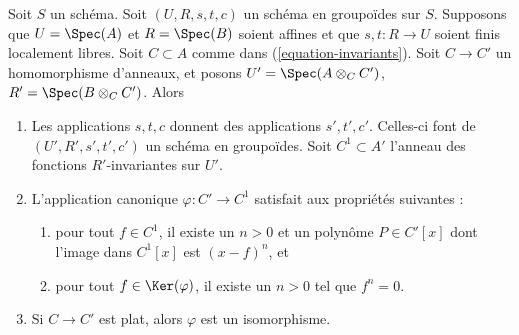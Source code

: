 \begin{lemma}
\label{lemma-invariants-base-change}
Soit $S$ un schéma. Soit $(U, R, s, t, c)$ un schéma en groupoïdes sur $S$.
Supposons que $U = \Spec(A)$ et $R = \Spec(B)$ soient affines et que
$s, t : R \to U$ soient finis localement libres. Soit $C \subset A$ comme dans
(\ref{equation-invariants}). Soit $C \to C'$ un homomorphisme d'anneaux, et posons
$U' = \Spec(A \otimes_C C')$,
$R' = \Spec(B \otimes_C C')$.
Alors
\begin{enumerate}
\item Les applications $s, t, c$ donnent des applications $s', t', c'$.
Celles-ci font de $(U', R', s', t', c')$ un schéma en groupoïdes. Soit $C^1 \subset A'$
l'anneau des fonctions $R'$-invariantes sur $U'$.
\item L'application canonique $\varphi : C' \to C^1$ satisfait aux propriétés suivantes :
\begin{enumerate}
\item pour tout $f \in C^1$, il existe un $n > 0$ et un
polynôme $P \in C'[x]$ dont l'image dans $C^1[x]$ est
$(x - f)^n$, et
\item pour tout $f \in \Ker(\varphi)$, il existe
un $n > 0$ tel que $f^n = 0$.
\end{enumerate}
\item Si $C \to C'$ est plat, alors $\varphi$ est un isomorphisme.
\end{enumerate}
\end{lemma}

